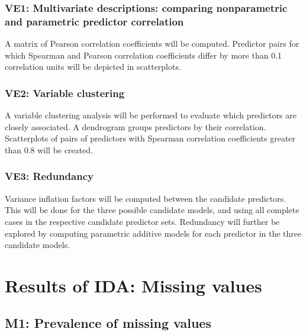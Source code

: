 \documentclass[
  letterpaper,
  DIV=11,
  numbers=noendperiod]{scrreport}
\begin{document}
\hypertarget{ve1-multivariate-descriptions-comparing-nonparametric-and-parametric-predictor-correlation}{%
\subsection{VE1: Multivariate descriptions: comparing nonparametric and
parametric predictor
correlation}\label{ve1-multivariate-descriptions-comparing-nonparametric-and-parametric-predictor-correlation}}

A matrix of Pearson correlation coefficients will be computed. Predictor
pairs for which Spearman and Pearson correlation coefficients differ by
more than 0.1 correlation units will be depicted in scatterplots.

\hypertarget{ve2-variable-clustering}{%
\subsection{VE2: Variable clustering}\label{ve2-variable-clustering}}

A variable clustering analysis will be performed to evaluate which
predictors are closely associated. A dendrogram groups predictors by
their correlation. Scatterplots of pairs of predictors with Spearman
correlation coefficients greater than 0.8 will be created.

\hypertarget{ve3-redundancy}{%
\subsection{VE3: Redundancy}\label{ve3-redundancy}}

Variance inflation factors will be computed between the candidate
predictors. This will be done for the three possible candidate models,
and using all complete cases in the respective candidate predictor sets.
Redundancy will further be explored by computing parametric additive
models for each predictor in the three candidate models.


\hypertarget{Missing}{%
\chapter{Results of IDA: Missing values}\label{Missing}}

\hypertarget{m1-prevalence-of-missing-values-1}{%
\section{M1: Prevalence of missing
values}\label{m1-prevalence-of-missing-values-1}}
\end{document}
